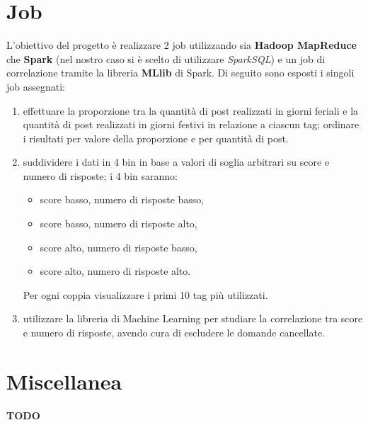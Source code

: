 \documentclass[
  a4paper,            %
  10pt                %
]{article}
\begin{document}
  \section{Job}\label{sec:job}

  L'obiettivo del progetto è realizzare 2 job utilizzando sia \textbf{Hadoop MapReduce} che \textbf{Spark} (nel nostro caso si è scelto di utilizzare \textit{SparkSQL})
  e un job di correlazione tramite la libreria \textbf{MLlib} di Spark.
  Di seguito sono esposti i singoli job assegnati:

  \begin{enumerate}
    \item
      effettuare la proporzione tra la quantità di post realizzati in giorni feriali e la quantità di post realizzati in giorni festivi in relazione a ciascun tag;
      ordinare i risultati per valore della proporzione e per quantità di post.

    \item
      suddividere i dati in 4 bin in base a valori di soglia arbitrari su score e numero di risposte; i 4 bin saranno:
      \begin{itemize}
        \item score basso, numero di risposte basso,
        \item score basso, numero di risposte alto,
        \item score alto, numero di risposte basso,
        \item score alto, numero di risposte alto.
      \end{itemize}
      Per ogni coppia visualizzare i primi 10 tag più utilizzati.

    \item
      utilizzare la libreria di Machine Learning per studiare la correlazione tra score e numero di risposte, avendo cura di escludere le domande cancellate.
  \end{enumerate}

  
  
  

  \section{Miscellanea}\label{sec:miscellaneous}

  \textbf{TODO}
\end{document}
